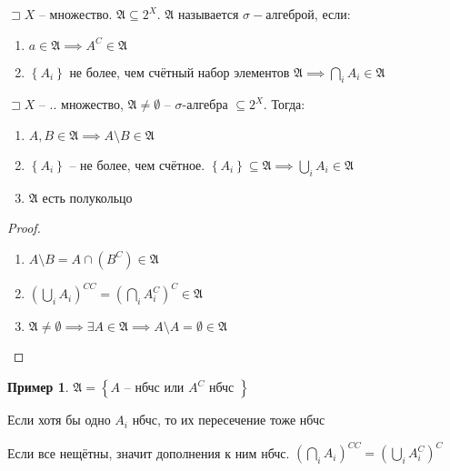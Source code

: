 \documentclass{book}
\renewcommand\O{\ensuremath{\emptyset}}
\theoremstyle{definition}
\newtheorem*{example}{Пример}
\begin{document}
\begin{definition}
    $\sqsupset X$ -- множество. $\mathfrak A \subseteq 2^X$. $\mathfrak A$ называется  $\sigma-$алгеброй, если:
     \begin{enumerate}
        \item $a\in \mathfrak A \implies A^C \in \mathfrak A$
        \item $\left\{ A_i \right\} $ не более, чем счётный набор элементов $\mathfrak A \implies \bigcap\limits_{i}A_i\in \mathfrak A $
    \end{enumerate}
\end{definition}

\begin{statement}
    $\sqsupset X$ -- .. множество, $\mathfrak A\neq \O $ --  $\sigma$-алгебра $\subseteq 2^X$. Тогда:
    \begin{enumerate}
        \item $A, B\in\mathfrak A \implies A\setminus B \in \mathfrak A$
        \item $\left\{ A_i \right\} $ -- не более, чем счётное. $\left\{ A_i \right\} \subseteq \mathfrak A \implies \bigcup\limits_{i}A_i\in \mathfrak A $ 
        \item $\mathfrak A$ есть полукольцо
    \end{enumerate}
\end{statement}
\begin{proof}
    \begin{enumerate}
        \item $A\setminus B = A\cap \left( B^C \right) \in \mathfrak A$ 
        \item $\left( \bigcup\limits_{i} A_i \right) ^{C C} = \left( \bigcap\limits_{i} A_i^C \right)^C\in \mathfrak A $
        \item $\mathfrak A \neq  \O \implies \exists A\in \mathfrak A \implies A\setminus A = \O \in \mathfrak A$
    \end{enumerate}
\end{proof}

\begin{example}
    $\mathfrak A = \left\{ A \text{ -- нбчс или }A^C \text{ нбчс } \right\} $ 

    Если хотя бы одно $A_i$ нбчс, то их пересечение тоже нбчс

    Если все нещётны, значит дополнения к ним нбчс.  $\left( \bigcap\limits_{i} A_i \right) ^{C C} = \left( \bigcup\limits_{i} A_i^C \right) ^C$
\end{example}
\end{document}
